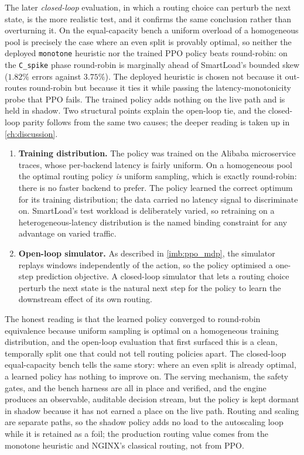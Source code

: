 The later \emph{closed-loop} evaluation, in which a routing choice can perturb the
next state, is the more realistic test, and it confirms the same conclusion rather than
overturning it. On the equal-capacity bench a uniform overload of a homogeneous pool is
precisely the case where an even split is provably optimal, so neither the deployed
\texttt{monotone} heuristic nor the trained PPO policy beats round-robin: on the
\texttt{C\_spike} phase round-robin is marginally ahead of SmartLoad's bounded skew
($1.82\%$ errors against $3.75\%$). The deployed heuristic is chosen not because it
out-routes round-robin but because it ties it while passing the latency-monotonicity
probe that PPO fails. The trained policy adds nothing on the live path and is held in
shadow. Two structural points explain the open-loop tie, and the closed-loop parity
follows from the same two causes; the deeper reading is taken up in \cref{ch:discussion}.

\begin{enumerate}
  \item \textbf{Training distribution.} The policy was trained on the Alibaba
        microservice traces, whose per-backend latency is fairly uniform. On a
        homogeneous pool the optimal routing policy \emph{is} uniform sampling,
        which is exactly round-robin: there is no faster backend to prefer. The
        policy learned the correct optimum for its training distribution; the data
        carried no latency signal to discriminate on. SmartLoad's test workload is
        deliberately varied, so retraining on a heterogeneous-latency distribution
        is the named binding constraint for any advantage on varied traffic.
  \item \textbf{Open-loop simulator.} As described in \cref{imb:ppo_mdp}, the
        simulator replays windows independently of the action, so the policy
        optimised a one-step prediction objective. A closed-loop simulator that
        lets a routing choice perturb the next state is the natural next step for
        the policy to learn the downstream effect of its own routing.
\end{enumerate}

The honest reading is that the learned policy converged to round-robin equivalence
because uniform sampling is optimal on a homogeneous training distribution, and the
open-loop evaluation that first surfaced this is a clean, temporally split one that
could not tell routing policies apart. The closed-loop equal-capacity bench tells the
same story: where an even split is already optimal, a learned policy has nothing to
improve on. The serving mechanism, the safety
gates, and the bench harness are all in place and verified, and the engine produces
an observable, auditable decision stream, but the policy is kept dormant in shadow
because it has not earned a place on the live path. Routing and scaling are
separate paths, so the shadow policy adds no load to the autoscaling loop while it
is retained as a foil; the production routing value comes from the monotone
heuristic and NGINX's classical routing, not from PPO.

